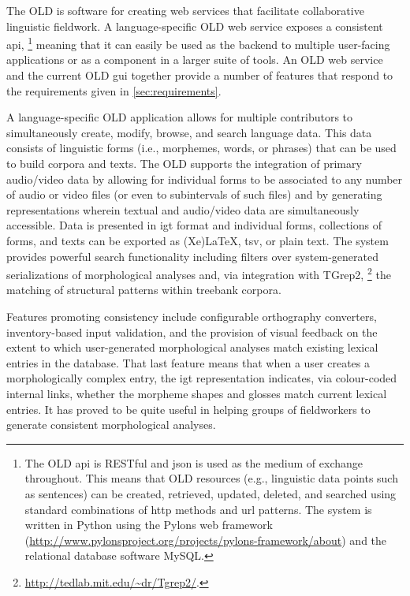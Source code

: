 \documentclass[11pt]{article}
\begin{document}
The OLD is software for creating web services that facilitate collaborative
linguistic fieldwork. A language-specific OLD web service exposes a consistent
\gls{api},%
\footnote{The OLD \gls{api} is RESTful and \gls{json} is used as the medium
    of exchange throughout. This means that OLD resources (e.g., linguistic
    data points such as sentences) can be created, retrieved, updated, deleted,
    and searched using standard combinations of \gls{http} methods and \gls{url}
    patterns. The system is written in Python using the Pylons web framework
    (\url{http://www.pylonsproject.org/projects/pylons-framework/about}) and the
relational database software MySQL.} %
meaning that it can easily be used as the backend to multiple user-facing
applications or as a component in a larger suite of tools. An OLD web service
and the current OLD \gls{gui} together provide a number of features that
respond to the requirements given in \autoref{sec:requirements}.

A language-specific OLD application allows for multiple contributors to
simultaneously create, modify, browse, and search language data. This data
consists of linguistic forms (i.e., morphemes, words, or phrases) that can be
used to build corpora and texts. The OLD supports the integration of primary
audio/video data by allowing for individual forms to be associated to any
number of audio or video files (or even to subintervals of such files) and
by generating representations wherein textual and audio/video data are
simultaneously accessible. Data is presented in \gls{igt} format and individual
forms, collections of forms, and texts can be exported as (Xe)LaTeX, \gls{tsv},
or plain text. The system provides powerful search functionality including filters
over system-generated serializations of morphological analyses and, via integration
with TGrep2,%
\footnote{\url{http://tedlab.mit.edu/~dr/Tgrep2/}.} %
the matching of structural patterns within treebank corpora.

Features promoting consistency include configurable orthography converters,
inventory-based input validation, and the provision of visual feedback on
the extent to which user-generated morphological analyses match existing
lexical entries in the database. That last feature means that when a user
creates a morphologically complex entry, the \gls{igt} representation
indicates, via colour-coded internal links, whether the morpheme shapes and
glosses match current lexical entries. It has proved to be quite useful in
helping groups of fieldworkers to generate consistent morphological analyses.
\end{document}
